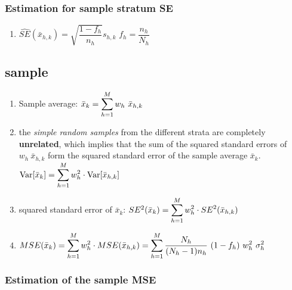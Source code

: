 \subsubsection{Estimation for sample stratum SE}
\begin{enumerate}
    \item $
        \hat{SE}(\bar{x}_{h,k})
        = \sqrt{\dfrac{1 - f_h}{n_h}} s_{h,k}
    $
    \hfill
    $f_h = \dfrac{n_h}{N_h}$
    \hfill \cite{statistics/book/Statistics-for-Data-Scientists/Maurits-Kaptein}
\end{enumerate}



\subsection{sample}
\begin{enumerate}
    \item Sample average: $
        \bar{x}_k = \displaystyle\sum^M_{h=1} w_h\ \bar{x}_{h,k}
    $
    \hfill \cite{statistics/book/Statistics-for-Data-Scientists/Maurits-Kaptein}

    \item the \textit{simple random samples} from the different strata are completely \textbf{unrelated}, which implies that the sum of the squared standard errors of $w_h \ \bar{x}_{h,k}$ form the squared standard error of the sample average $\bar{x}_k$.
    \hfill \cite{statistics/book/Statistics-for-Data-Scientists/Maurits-Kaptein}
    \\
    $
        \text{Var}[\bar{x}_k] = \displaystyle\sum_{h=1}^M w_h^2 \cdot \text{Var}[\bar{x}_{h,k}]
    $
    \hfill \cite{common/online/chatgpt}


    \item squared standard error of $\bar{x}_k$:
    $
        SE^2(\bar{x}_k) = \displaystyle\sum_{h=1}^M w_h^2 \cdot SE^2(\bar{x}_{h,k})
    $
    \hfill \cite{common/online/chatgpt}

    \item $
        MSE(\bar{x}_k )
        = \dsum^M_{h=1} w^2_h \cdot MSE(\bar{x}_{h,k} )
        = \dsum^M_{h=1} \dfrac{N_h}{(N_h - 1)n_h} \ (1 - f_h)\ w^2_h\ \sigma^2_h$
    \hfill \cite{statistics/book/Statistics-for-Data-Scientists/Maurits-Kaptein}

\end{enumerate}


\subsubsection{Estimation of the sample MSE}


